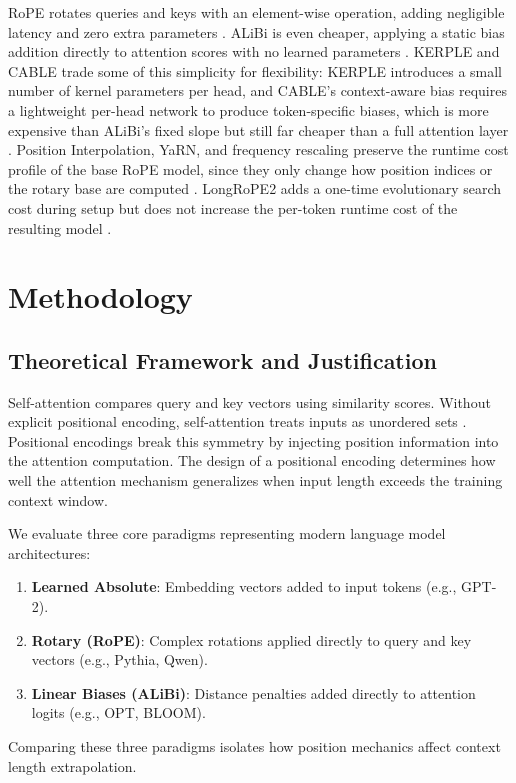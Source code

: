 \documentclass[conference]{IEEEtran}
\begin{document}
RoPE rotates queries and keys with an element-wise operation, adding negligible latency and zero extra parameters \cite{su2024roformer}. ALiBi is even cheaper, applying a static bias addition directly to attention scores with no learned parameters \cite{press2022}. KERPLE and CABLE trade some of this simplicity for flexibility: KERPLE introduces a small number of kernel parameters per head, and CABLE's context-aware bias requires a lightweight per-head network to produce token-specific biases, which is more expensive than ALiBi's fixed slope but still far cheaper than a full attention layer \cite{chi2022,veisi2025cable}. Position Interpolation, YaRN, and frequency rescaling preserve the runtime cost profile of the base RoPE model, since they only change how position indices or the rotary base are computed \cite{chen2023,peng2023yarn,liu2024scaling}. LongRoPE2 adds a one-time evolutionary search cost during setup but does not increase the per-token runtime cost of the resulting model \cite{shang2025longrope2}.

\section{Methodology}
\label{sec:methodology}

\subsection{Theoretical Framework and Justification}

Self-attention compares query and key vectors using similarity scores. Without explicit positional encoding, self-attention treats inputs as unordered sets \cite{vaswani2017}. Positional encodings break this symmetry by injecting position information into the attention computation. The design of a positional encoding determines how well the attention mechanism generalizes when input length exceeds the training context window.

We evaluate three core paradigms representing modern language model architectures:
\begin{enumerate}
\item \textbf{Learned Absolute}: Embedding vectors added to input tokens (e.g., GPT-2).
\item \textbf{Rotary (RoPE)}: Complex rotations applied directly to query and key vectors \cite{su2024roformer} (e.g., Pythia, Qwen).
\item \textbf{Linear Biases (ALiBi)}: Distance penalties added directly to attention logits \cite{press2022} (e.g., OPT, BLOOM).
\end{enumerate}
Comparing these three paradigms isolates how position mechanics affect context length extrapolation.
\end{document}
